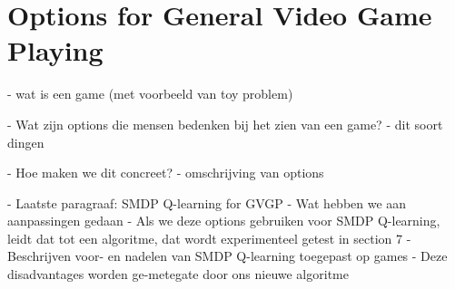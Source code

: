 \chapter{Options for General Video Game Playing}

- wat is een game (met voorbeeld van toy problem)

- Wat zijn options die mensen bedenken bij het zien van een game?
	- dit soort dingen

- Hoe maken we dit concreet?
	- omschrijving van options

- Laatste paragraaf: SMDP Q-learning for GVGP
	- Wat hebben we aan aanpassingen gedaan
	- Als we deze options gebruiken voor SMDP Q-learning, leidt dat tot een
	algoritme, dat wordt experimenteel getest in section 7
	- Beschrijven voor- en nadelen van SMDP Q-learning toegepast op games
		- Deze disadvantages worden ge-metegate door ons nieuwe algoritme

